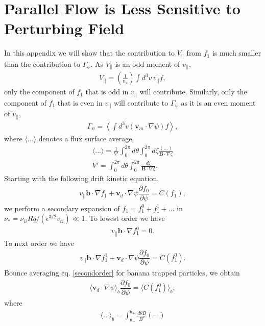 \documentclass{article}
\numberwithin{figure}{section}
\numberwithin{equation}{section}
\newcommand{\partder}[2]{\dfrac{\partial  #1}{\partial  #2}} %
\begin{document}
\section{Parallel Flow is Less Sensitive to Perturbing Field} \label{parallelflow}
In this appendix we will show that the contribution to $V_{||}$ from $f_1$ is much smaller than the contribution to $\Gamma_{\psi}$. As $V_{||}$ is an odd moment of $v_{||}$,
\begin{gather}
V_{||} = \left(\frac{1}{n_s}\right) \int d^3 v \, v_{||} f,
\end{gather}
only the component of $f_1$ that is odd in $v_{||}$ will contribute. Similarly, only the component of $f_1$ that is even in $v_{||}$ will contribute to $\Gamma_{\psi}$ as it is an even moment of $v_{||}$,
\begin{gather}
\Gamma_{\psi} = \left \langle \int d^3v (\bm{v}_m \cdot \nabla \psi) f \right \rangle,
\end{gather}
where $\langle ... \rangle$ denotes a flux surface average,
\begin{gather}
\langle ... \rangle = \frac{1}{V'} \int_0^{2 \pi} d \theta \int_0^{2 \pi} d \zeta \frac{ (...)}{\bm{B} \cdot \nabla \zeta}
\\ V' = \int_0^{2\pi} d \theta \int_0^{2 \pi} \frac{d \zeta}{\bm{B} \cdot \nabla \zeta}.
\end{gather}
Starting with the following drift kinetic equation,
\begin{gather}
v_{||} \bm{b} \cdot \nabla f_1 + \bm{v}_d \cdot \nabla \psi \partder{f_0}{\psi} = C(f_1),
\end{gather}
we perform a secondary expansion of $f_1 = f_1^0 + f_1^1 + ...$ in $\nu_* = \nu_{ii} Rq/(\epsilon^{3/2} v_{ti}) \ll 1$. To lowest order we have
\begin{gather}
v_{||} \bm{b} \cdot \nabla f_1^0 = 0.
\label{firstorder}
\end{gather}
To next order we have
\begin{gather}
v_{||} \bm{b} \cdot \nabla f_1^1 + \bm{v}_d \cdot \nabla \psi \partder{f_0}{\psi} = C(f_1^0).
\label{secondorder}
\end{gather}
Bounce averaging eq. \ref{secondorder} for banana trapped particles, we obtain
\begin{gather}
\langle \bm{v}_d \cdot \nabla \psi \rangle_b \partder{f_0}{\psi} = \langle C(f_1^0) \rangle_b,
\label{bounceaverage}
\end{gather}
where 
\begin{gather}
\langle ... \rangle_b = \int_{\theta_-}^{\theta_+} \frac{d \theta B}{B^{\theta}} (...)
\end{gather}
\end{document}
